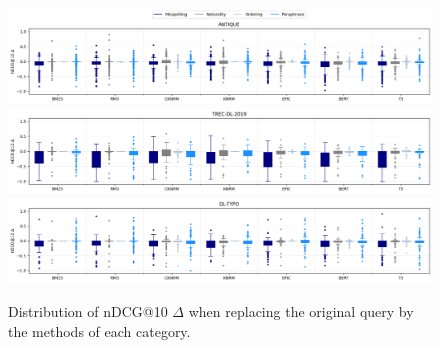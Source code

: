 \begin{figure}[ht]
    \centering
    \includegraphics[width=1\linewidth]{5Results/main/plot_dist_antique.png}
    \includegraphics[width=1\linewidth]{5Results/main/plot_dist_trec.png}
    \includegraphics[width=1\linewidth]{5Results/main/plot_dist_dl-typo.png}
    \caption{Distribution of nDCG@10 $\Delta$ when replacing the original query by the methods of each category.}
    \label{fig:dist-plots}
\end{figure}

